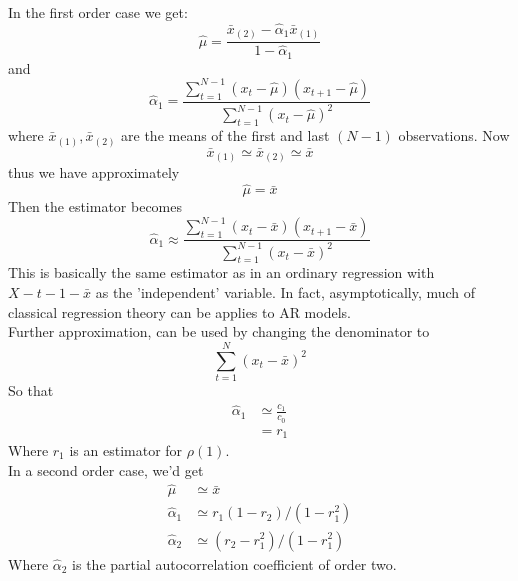 In the first order case we get: \[
\hat{\mu} = \frac{\bar{x}_{(2)} - \hat{\alpha}_1 \bar{x}_{(1)}}{1-\hat{\alpha}_1}
\] and \[
\hat{\alpha}_1 = \frac{\sum_{t=1}^{N-1} (x_t-\hat{\mu})(x_{t+1}-\hat{\mu}) }{\sum_{t=1}^{N-1} (x_t- \hat{\mu})^2}
\] where $\bar{x}_{(1)},\bar{x}_{(2)} $ are the means of the first and last $(N-1)$ observations. Now \[ 
\bar{x}_{(1)} \simeq \bar{x}_{(2)} \simeq \bar{x}
\] thus we have approximately \[
\hat{\mu} = \bar{x}
\] Then the estimator becomes \[
\hat{\alpha}_1 \approx \frac{\sum_{t=1}^{N-1} (x_t-\bar{x})(x_{t+1}-\bar{x}) }{\sum_{t=1}^{N-1} (x_t- \bar{x})^2}
\]
This is basically the same estimator as in an ordinary regression with $X-{t-1}-\bar{x}$ as the 'independent' variable. In fact, asymptotically, much of classical regression theory can be applies to AR models. \\
Further approximation, can be used by changing the denominator to \[\sum_{t=1}^N(x_t-\bar{x})^2\] So that \begin{align*}
    \hat{{\alpha}}_1 &\simeq \frac{c_1}{c_0}\\
    &= r_1
\end{align*} Where $r_1$ is an estimator for $\rho(1)$. \\

In a second order case, we'd get \begin{align*}
    \hat{\mu} &\simeq \bar{x}\\
    \hat{\alpha}_1 &\simeq r_1(1-r_2)/(1-r_1^2) \\
    \hat{\alpha}_2 &\simeq (r_2-r_1^2)/(1-r_1^2)
\end{align*} Where $\hat{\alpha}_2$ is the partial autocorrelation coefficient of order two. 

